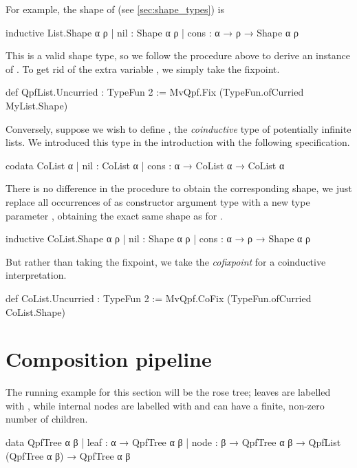 For example, the shape of  (see \cref{sec:shape_types}) is
\begin{leancode}
  inductive List.Shape α ρ
    | nil  : Shape α ρ
    | cons : α → ρ → Shape α ρ
\end{leancode}
This is a valid shape type, so we follow the procedure above to derive an instance of .
To get rid of the extra variable , we simply take the fixpoint.
\begin{leancode}
  def QpfList.Uncurried : TypeFun 2 
    := MvQpf.Fix (TypeFun.ofCurried MyList.Shape)
\end{leancode}

Conversely, suppose we wish to define , the \emph{coinductive} type of potentially infinite lists.
We introduced this type in the introduction with the following specification.
\begin{leancode}
  codata CoList α
    | nil  : CoList α
    | cons : α → CoList α → CoList α
\end{leancode}
There is no difference in the procedure to obtain the corresponding shape, we just replace all occurrences
of  as constructor argument type with a new type parameter , obtaining the exact same shape
as for .
\begin{leancode}
  inductive CoList.Shape α ρ
    | nil  : Shape α ρ
    | cons : α → ρ → Shape α ρ
\end{leancode}
But rather than taking the fixpoint, we take the \emph{cofixpoint} for a coinductive interpretation.
\begin{leancode}
  def CoList.Uncurried : TypeFun 2 
    := MvQpf.CoFix (TypeFun.ofCurried CoList.Shape)
\end{leancode}





\section{Composition pipeline}%
\label{sec:comp_pipeline}
The running example for this section will be the rose tree; leaves are labelled with , while
internal nodes are labelled with  and can have a finite, non-zero number of children.
\begin{leancode}
  data QpfTree α β
    | leaf : α → QpfTree α β
    | node : β → QpfTree α β → QpfList (QpfTree α β) → QpfTree α β
\end{leancode}


